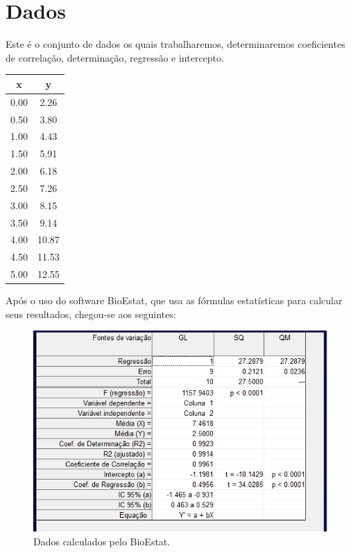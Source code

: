 
\section{Dados}
Este é o conjunto de dados os quais trabalharemos, determinaremos coeficientes de correlação, determinação, regressão e intercepto.
	\begin{table}[H]
		\center
	\begin{tabular}{|c|c|}
		\hline
		x    & y     \\ \hline
		0.00 & 2.26  \\ \hline
		0.50 & 3.80  \\ \hline
		1.00 & 4.43  \\ \hline
		1.50 & 5.91  \\ \hline
		2.00 & 6.18  \\ \hline
		2.50 & 7.26  \\ \hline
		3.00 & 8.15  \\ \hline
		3.50 & 9.14  \\ \hline
		4.00 & 10.87 \\ \hline
		4.50 & 11.53 \\ \hline
		5.00 & 12.55 \\ \hline
	\end{tabular}
\end{table}

Após o uso do software BioEstat, que usa as fórmulas estatísticas para calcular seus resultados, chegou-se aos seguintes:

\begin{figure}[H]
	\center
	\includegraphics[scale=0.7]{imagens/reglin.png}
	\caption{Dados calculados pelo BioEstat.}
\end{figure}

